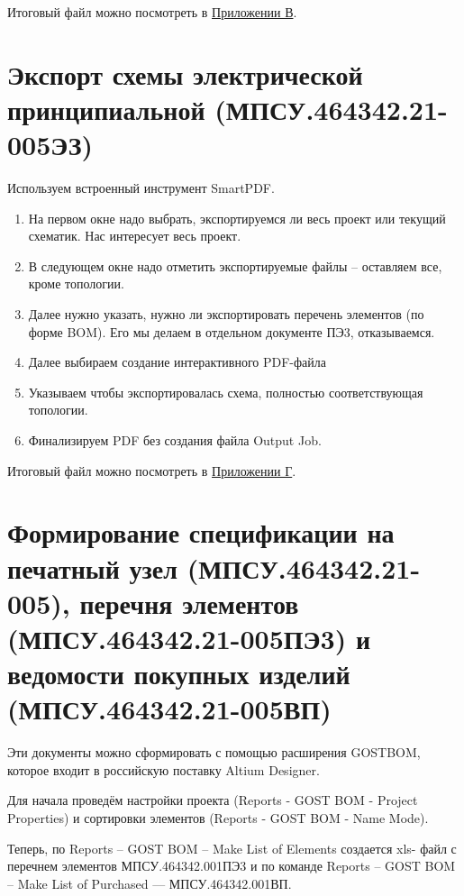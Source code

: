 Итоговый файл можно посмотреть в \hyperref[chap:appC]{Приложении В}.

\section[Экспорт схемы электрической принципиальной]{Экспорт схемы электрической принципиальной (МПСУ.464342.21-005ЭЗ)}

Используем встроенный инструмент SmartPDF. 

\begin{enumerate}
	\item На первом окне надо выбрать, экспортируемся ли 
	весь проект или текущий схематик. Нас интересует весь проект.
	\item В следующем окне надо отметить экспортируемые файлы –  оставляем 
	все, кроме топологии. 
	\item Далее нужно указать, нужно ли экспортировать перечень элементов (по 
	форме BOM). Его мы делаем в отдельном документе ПЭ3, отказываемся.
	\item Далее выбираем создание интерактивного PDF-файла
	\item Указываем чтобы  экспортировалась  схема,  полностью  соответствующая  топологии.
	\item Финализируем PDF без создания файла Output Job.
\end{enumerate}

Итоговый файл можно посмотреть в \hyperref[chap:appD]{Приложении Г}.

\section[Формирование спецификации на печатный узел, 
перечня элементов и ведомости покупных 
изделий]{Формирование спецификации на печатный узел (МПСУ.464342.21-005), перечня элементов (МПСУ.464342.21-005ПЭ3) и ведомости покупных изделий (МПСУ.464342.21-005ВП)}

Эти  документы  можно  сформировать  с  помощью  расширения GOSTBOM, которое входит в российскую поставку Altium Designer.  

Для начала проведём настройки проекта (Reports - GOST BOM - Project Properties) и сортировки элементов (Reports - GOST BOM - Name Mode).

Теперь, по Reports -- GOST BOM -- Make List of Elements создается xls-
файл с перечнем элементов МПСУ.464342.001ПЭ3 и по команде Reports -- GOST BOM -- Make List of Purchased --- МПСУ.464342.001ВП.

